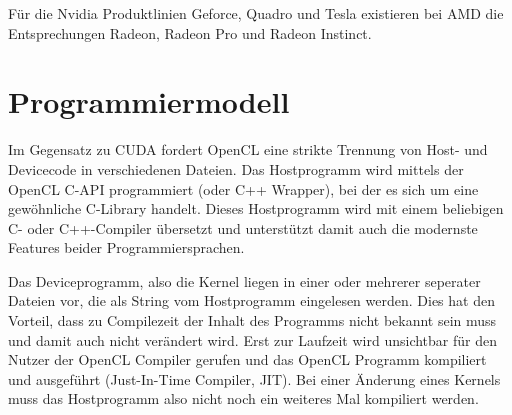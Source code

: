	    	Für die Nvidia Produktlinien Geforce, Quadro und Tesla existieren bei AMD die Entsprechungen Radeon, Radeon Pro und Radeon Instinct. 
	    	
		\section{Programmiermodell}
		Im Gegensatz zu CUDA fordert OpenCL eine strikte Trennung von Host- und Devicecode in verschiedenen Dateien. Das Hostprogramm wird mittels der OpenCL C-\Gls{API} programmiert (oder C++ Wrapper), bei der es sich um eine gewöhnliche C-Library handelt. Dieses Hostprogramm wird mit einem beliebigen C- oder C++-Compiler übersetzt und unterstützt damit auch die modernste Features beider Programmiersprachen.
		
		Das Deviceprogramm, also die \Gls{Kernel} liegen in einer oder mehrerer seperater Dateien vor, die als String vom Hostprogramm eingelesen werden. Dies hat den Vorteil, dass zu Compilezeit der Inhalt des Programms nicht bekannt sein muss und damit auch nicht verändert wird. Erst zur Laufzeit wird unsichtbar für den Nutzer der OpenCL Compiler gerufen und das OpenCL Programm kompiliert und ausgeführt (Just-In-Time Compiler, JIT). Bei einer Änderung eines \Glspl{Kernel} muss das Hostprogramm also nicht noch ein weiteres Mal kompiliert werden.
		
